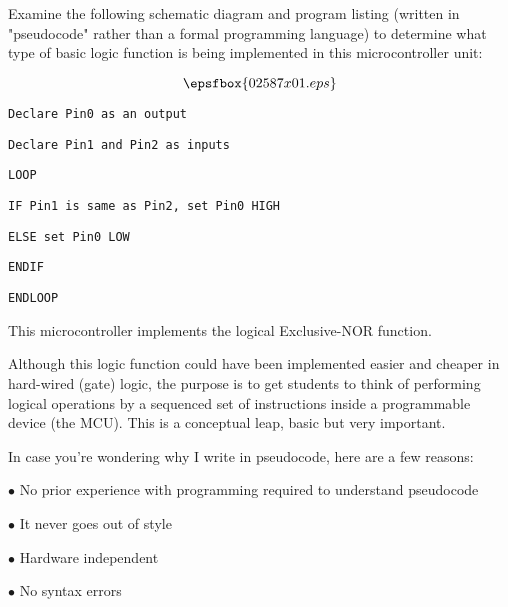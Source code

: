 

Examine the following schematic diagram and program listing (written in "pseudocode" rather than a formal programming language) to determine what type of basic logic function is being implemented in this microcontroller unit:

$$\epsfbox{02587x01.eps}$$

\noindent
{}

{\tt Declare Pin0 as an output}

{\tt Declare Pin1 and Pin2 as inputs}

{\tt LOOP}

\hskip 10pt {\tt IF Pin1 is same as Pin2, set Pin0 HIGH}

\hskip 10pt {\tt ELSE set Pin0 LOW}

\hskip 10pt {\tt ENDIF}

{\tt ENDLOOP}

\vskip 10pt







This microcontroller implements the logical Exclusive-NOR function.







Although this logic function could have been implemented easier and cheaper in hard-wired (gate) logic, the purpose is to get students to think of performing logical operations by a sequenced set of instructions inside a programmable device (the MCU).  This is a conceptual leap, basic but very important.

\vskip 10pt

In case you're wondering why I write in pseudocode, here are a few reasons:

\medskip
\goodbreak
\item{$\bullet$} No prior experience with programming required to understand pseudocode
\item{$\bullet$} It never goes out of style
\item{$\bullet$} Hardware independent
\item{$\bullet$} No syntax errors
\medskip


